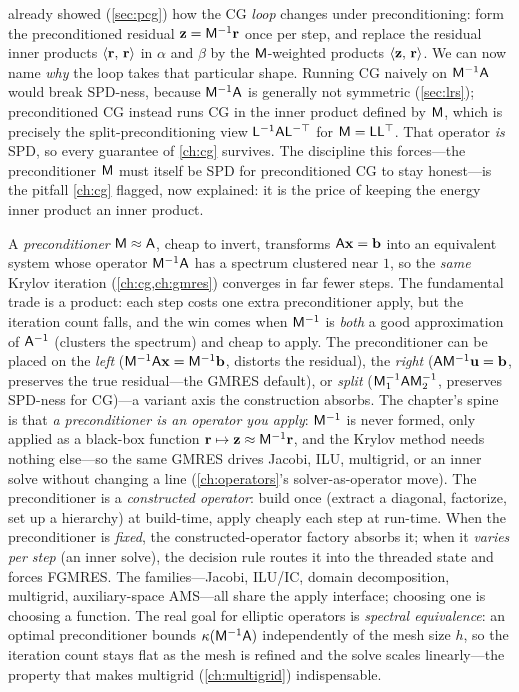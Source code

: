  already showed (\cref{sec:pcg}) how the CG \emph{loop} changes under
preconditioning: form the preconditioned residual $\mathbf{z}=\mathsf{M}^{-1}\mathbf{r}$ once per step, and
replace the residual inner products $\left\langle \mathbf{r},\, \mathbf{r}\right\rangle$ in $\alpha$ and $\beta$ by the
$\mathsf{M}$-weighted products $\left\langle \mathbf{z},\, \mathbf{r}\right\rangle$. We can now name \emph{why} the loop takes that
particular shape. Running CG naively on $\mathsf{M}^{-1}\mathsf{A}$ would break SPD-ness, because
$\mathsf{M}^{-1}\mathsf{A}$ is generally not symmetric (\cref{sec:lrs}); preconditioned CG instead
runs CG in the inner product defined by $\mathsf{M}$, which is precisely the split-preconditioning
view $\mathsf{L}^{-1}\mathsf{A}\mathsf{L}^{-\top}$ for $\mathsf{M}=\mathsf{L}\mathsf{L}^{\top}$. That operator
\emph{is} SPD, so every guarantee of \cref{ch:cg} survives. The discipline this forces---the
preconditioner $\mathsf{M}$ must itself be SPD for preconditioned CG to stay honest---is the
pitfall \cref{ch:cg} flagged, now explained: it is the price of keeping the energy inner
product an inner product.

\summarysection
A \emph{preconditioner} $\mathsf{M}\approx\mathsf{A}$, cheap to invert, transforms
$\mathsf{A}\mathbf{x}=\mathbf{b}$ into an equivalent system whose operator $\mathsf{M}^{-1}\mathsf{A}$ has a
spectrum clustered near $1$, so the \emph{same} Krylov iteration (\cref{ch:cg,ch:gmres})
converges in far fewer steps. The fundamental trade is a product: each step costs one extra
preconditioner apply, but the iteration count falls, and the win comes when $\mathsf{M}^{-1}$ is
\emph{both} a good approximation of $\mathsf{A}^{-1}$ (clusters the spectrum) and cheap to apply.
The preconditioner can be placed on the \emph{left} ($\mathsf{M}^{-1}\mathsf{A}\mathbf{x}=\mathsf{M}^{-1}\mathbf{b}$,
distorts the residual), the \emph{right} ($\mathsf{A}\mathsf{M}^{-1}\mathbf{u}=\mathbf{b}$, preserves the true
residual---the GMRES default), or \emph{split} ($\mathsf{M}_1^{-1}\mathsf{A}\mathsf{M}_2^{-1}$,
preserves SPD-ness for CG)---a variant axis the construction absorbs. The chapter's spine is
that \emph{a preconditioner is an operator you apply}: $\mathsf{M}^{-1}$ is never formed, only
applied as a black-box function $\mathbf{r}\mapsto\mathbf{z}\approx\mathsf{M}^{-1}\mathbf{r}$, and the Krylov method
needs nothing else---so the same GMRES drives Jacobi, ILU, multigrid, or an inner solve
without changing a line (\cref{ch:operators}'s solver-as-operator move). The preconditioner is
a \emph{constructed operator}: build once (extract a diagonal, factorize, set up a hierarchy)
at build-time, apply cheaply each step at run-time. When the preconditioner is \emph{fixed},
the constructed-operator factory absorbs it; when it \emph{varies per step} (an inner solve),
the decision rule routes it into the threaded state and forces FGMRES. The families---Jacobi,
ILU/IC, domain decomposition, multigrid, auxiliary-space AMS---all share the apply interface;
choosing one is choosing a function. The real goal for elliptic operators is \emph{spectral
equivalence}: an optimal preconditioner bounds $\kappa(\mathsf{M}^{-1}\mathsf{A})$ independently of
the mesh size $h$, so the iteration count stays flat as the mesh is refined and the solve
scales linearly---the property that makes multigrid (\cref{ch:multigrid}) indispensable.

